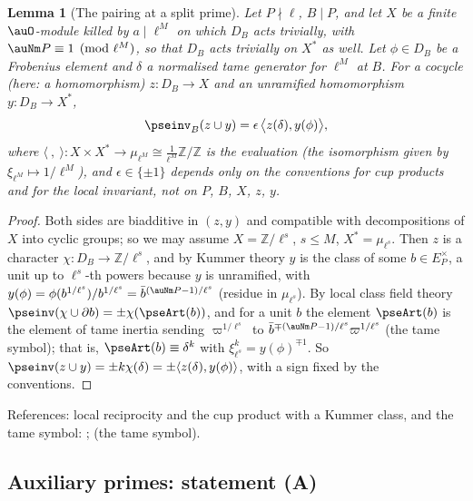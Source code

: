 \documentclass[10pt]{amsart}
\newtheorem{lemma}[theorem]{Lemma}
\theoremstyle{definition}
\theoremstyle{remark}
\newcommand{\Z}{\mathbb Z}
\begin{document}
\begin{lemma}[The pairing at a split prime]\label{pse:pairing}
Let $P\nmid\ell$, $B\mid P$, and let $X$ be a finite $\auO$-module killed by $a\mid\ell^M$ on which
$D_B$ acts trivially, with $\auNm P\equiv1\pmod{\ell^M}$, so that $D_B$ acts trivially on $X^*$ as
well. Let $\phi\in D_B$ be a Frobenius element and $\delta$ a normalised tame generator for
$\ell^M$ at $B$. For a cocycle (here: a homomorphism) $z\colon D_B\to X$ and an unramified
homomorphism $y\colon D_B\to X^*$,
\[
\pseinv_B(z\cup y)=\epsilon\,\bigl\langle z(\delta),y(\phi)\bigr\rangle ,
\]
where $\langle\ ,\ \rangle\colon X\times X^*\to\mu_{\ell^M}\cong\frac1{\ell^M}\Z/\Z$ is the
evaluation (the isomorphism given by $\xi_{\ell^M}\mapsto1/\ell^M$), and $\epsilon\in\{\pm1\}$
depends only on the conventions for cup products and for the local invariant, not on $P$, $B$,
$X$, $z$, $y$.
\end{lemma}
\begin{proof}
Both sides are biadditive in $(z,y)$ and compatible with decompositions of $X$ into cyclic groups;
so we may assume $X=\Z/\ell^s$, $s\le M$, $X^*=\mu_{\ell^s}$. Then $z$ is a character
$\chi\colon D_B\to\Z/\ell^s$, and by Kummer theory $y$ is the class of some $b\in E_P^\times$,
a unit up to $\ell^s$-th powers because $y$ is unramified, with $y(\phi)=\phi(b^{1/\ell^s})/
b^{1/\ell^s}=\bar b^{(\auNm P-1)/\ell^s}$ (residue in $\mu_{\ell^s}$). By local class field theory
$\pseinv(\chi\cup\partial b)=\pm\chi(\pseArt(b))$, and for a unit $b$ the element $\pseArt(b)$ is the
element of tame inertia sending $\varpi^{1/\ell^s}$ to $\bar b^{\mp(\auNm P-1)/\ell^s}
\varpi^{1/\ell^s}$ (the tame symbol); that is, $\pseArt(b)\equiv\delta^{k}$ with $\xi_{\ell^s}^k=
y(\phi)^{\mp1}$. So $\pseinv(z\cup y)=\pm k\chi(\delta)=\pm\langle z(\delta),y(\phi)\rangle$, with a
sign fixed by the conventions.
\end{proof}
\noindent References: local reciprocity and the cup product with a Kummer class, and the tame
symbol: \cite[XIV, \S1, Proposition~3; \S2, Proposition~6; \S3, Proposition~8 and its Corollary]{SerreLF}; \cite[Ch.~I, Remark~2.5(b)]{MilneADT} (the tame symbol).

\subsection{Auxiliary primes: statement (A)}\label{pse:ss-aux}
\end{document}
